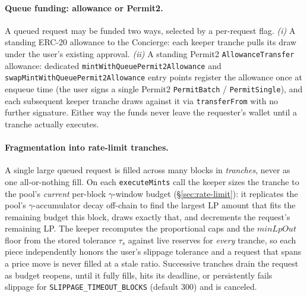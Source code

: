 \documentclass[11pt]{article}
\begin{document}
\paragraph{Queue funding: allowance or Permit2.} A queued request may be
funded two ways, selected by a per-request flag. \emph{(i)} A standing
ERC-20 allowance to the Concierge: each keeper tranche pulls its draw
under the user's existing approval. \emph{(ii)} A standing Permit2
\texttt{AllowanceTransfer} allowance: dedicated \texttt{mint\-With\-Queue\-Permit2\-Allowance}
and \texttt{swapMint\-With\-Queue\-Permit2\-Allowance} entry points
register the allowance once at enqueue time (the user signs a single
Permit2 \texttt{PermitBatch} / \texttt{PermitSingle}), and each
subsequent keeper tranche draws against it via \texttt{transferFrom} with
no further signature. Either way the funds never leave the requester's
wallet until a tranche actually executes.

\paragraph{Fragmentation into rate-limit tranches.} A single large
queued request is filled across many blocks in \emph{tranches}, never as
one all-or-nothing fill. On each \texttt{executeMints} call the keeper
sizes the tranche to the pool's \emph{current} per-block $\gamma$-window
budget (\S\ref{sec:rate-limit}): it replicates the pool's
$\gamma$-accumulator decay off-chain to find the largest LP amount that
fits the remaining budget this block, draws exactly that, and decrements
the request's remaining LP. The keeper recomputes the proportional caps
and the $\mathit{minLpOut}$ floor from the stored tolerance $\tau_s$
against live reserves for \emph{every} tranche, so each piece
independently honors the user's slippage tolerance and a request that
spans a price move is never filled at a stale ratio. Successive tranches
drain the request as budget reopens, until it fully fills, hits its
deadline, or persistently fails slippage for
\texttt{SLIPPAGE\_TIMEOUT\_BLOCKS} (default $300$) and is canceled.
\end{document}
